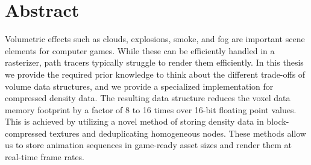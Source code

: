 \section*{Abstract} \label{abstract}
Volumetric effects such as clouds, explosions, smoke, and fog are important scene elements for computer games. While these can be efficiently handled in a rasterizer, path tracers typically struggle to render them efficiently. In this thesis we provide the required prior knowledge to think about the different trade-offs of volume data structures, and we provide a specialized implementation for compressed density data. The resulting data structure reduces the voxel data memory footprint by a factor of 8 to 16 times over 16-bit floating point values. This is achieved by utilizing a novel method of storing density data in block-compressed textures and deduplicating homogeneous nodes. These methods allow us to store animation sequences in game-ready asset sizes and render them at real-time frame rates.